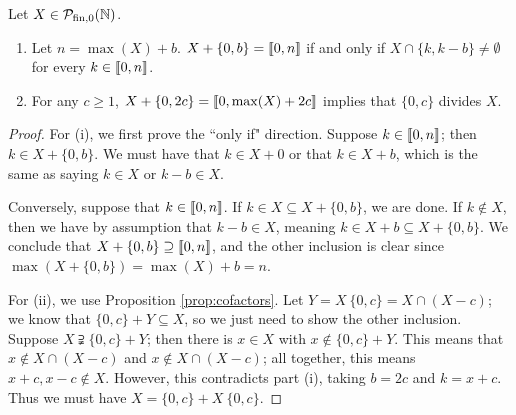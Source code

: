 
\begin{prop} \label{prop:2-elt factor/cofactor}
	Let $X\in {\mathcal{P}_{\textrm{fin},0}(\mathbb{N})}$.
	\begin{enumerate}[label={\rm (\roman{*})}]
		\item Let $n = \max(X) + b$. $X + \{0,b\} = \llbracket 0,n \rrbracket$ if and only if $X \cap \{k,k-b\} \neq \emptyset$ for every $k\in \llbracket 0,n \rrbracket$.
		\item For any $c\ge 1$, $X + \{0,2c\} = \llbracket 0,\max(X)+2c \rrbracket$ implies that $\{0,c\}$ divides $X$.
	\end{enumerate}
\end{prop}

\begin{proof}
	For (i), we first prove the ``only if" direction.  
	Suppose $k\in \llbracket 0,n \rrbracket$; then $k\in X + \{0,b\}$.
	We must have that $k\in X + 0$ or that $k \in X + b$, which is the same as saying $k\in X$ or $k-b\in X$.
	
	Conversely, suppose that $k\in \llbracket 0,n \rrbracket$.
	If $k\in X \subseteq X + \{0,b\}$, we are done.
	If $k\notin X$, then we have by assumption that $k-b\in X$, meaning $k\in X +b \subseteq X+ \{0,b\}$.
	We conclude that $X + \{0,b\} \supseteq \llbracket 0,n \rrbracket$, and the other inclusion is clear since $\max(X+\{0,b\}) = \max(X) + b = n$.
	
	For (ii), we use Proposition \ref{prop:cofactors}.
	Let $Y = X\:\{0,c\} = X\cap (X-c)$; we know that $\{0,c\} + Y \subseteq X$, so we just need to show the other inclusion.
	Suppose $X \supsetneqq \{0,c\} + Y$; then there is $x\in X$ with $x\notin \{0,c\} + Y$.
	This means that $x\notin X \cap (X-c)$ and $x \notin X \cap (X-c)$; all together, this means $x+c,x-c\notin X$.
	However, this contradicts part (i), taking $b = 2c$ and $k = x+c$.
	Thus we must have $X = \{0,c\} + X\:\{0,c\}$.
\end{proof}

